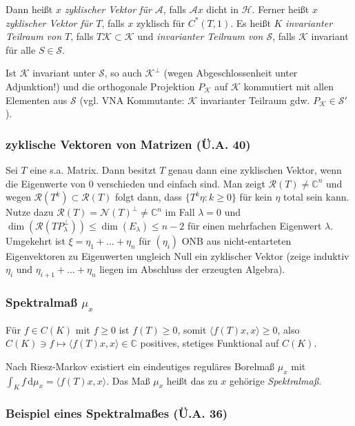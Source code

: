 \documentclass[11pt,a4paper]{scrartcl}
\newcommand{\C}{\mathbb{C}} %
\newcommand{\Hc}{\mathcal{H}}
\newcommand{\Sc}{\mathcal{S}}
\newcommand{\Kc}{\mathcal{K}}
\newcommand{\A}{\mathcal{A}}
\newcommand{\Nc}{\mathcal{N}}
\newcommand{\Rc}{\mathcal{R}}
\theoremstyle{plain}
\theoremstyle{definition}
\theoremstyle{remark}
\begin{document}
Dann heißt $x$ \emph{zyklischer Vektor für $\A$}, falls $\A x$ dicht in $\Hc$. Ferner heißt $x$ \emph{zyklischer Vektor für $T$}, falls $x$ zyklisch für $C^*(T,1)$. Es heißt $K$ \emph{invarianter Teilraum von $T$}, falls $T\Kc \subset \Kc$ und \emph{invarianter Teilraum von $\Sc$}, falls $\Kc$ invariant für alle $S\in \Sc$. 

Ist $\Kc$ invariant unter $\Sc$, so auch $\Kc^\bot$ (wegen Abgeschlossenheit unter Adjunktion!) und die orthogonale Projektion $P_\Kc$ auf $\Kc$ kommutiert mit allen Elementen aus $\Sc$ (vgl. VNA Kommutante: $\Kc$ invarianter Teilraum gdw. $P_\Kc\in \Sc'$).

\subsubsection{zyklische Vektoren von Matrizen (Ü.A. 40)}

Sei $T$ eine s.a. Matrix. Dann besitzt $T$ genau dann eine zyklischen Vektor, wenn die Eigenwerte von $0$ verschieden und einfach sind. Man zeigt $\Rc(T)\neq \C^n$ und wegen $\Rc(T^k) \subset \Rc(T)$ folgt dann, dass $\{T^k\eta: k\geq 0\}$ für kein $\eta$ total sein kann. Nutze dazu $\Rc(T)=\Nc(T)^\bot\neq \C^n$ im Fall $\lambda = 0$ und $\dim(\Rc(TP_\lambda^\bot))\leq \dim(E_\lambda) \leq n-2$ für einen mehrfachen Eigenwert $\lambda$. Umgekehrt ist $\xi=\eta_1+\dots+\eta_n$ für $(\eta_i)$ ONB aus nicht-entarteten Eigenvektoren zu Eigenwerten ungleich Null ein zyklischer Vektor (zeige induktiv $\eta_i$ und $\eta_{i+1}+\dots+\eta_n$ liegen im Abschluss der erzeugten Algebra).

\subsubsection{Spektralmaß $\mu_x$}

Für $f\in C(K)$ mit $f \geq 0$ ist $f(T) \geq 0$, somit $\langle f(T)x, x \rangle \geq 0$, also $C(K)\ni f \mapsto \langle f(T)x,x \rangle \in \C$ positives, stetiges Funktional auf $C(K)$.

Nach Riesz-Markov existiert ein eindeutiges reguläres Borelmaß $\mu_x$ mit $\int_K f \,\mathrm{d}\mu_x = \langle f(T)x, x \rangle$. Das Maß $\mu_x$ heißt das zu $x$ gehörige \emph{Spektralmaß}.


\subsubsection{Beispiel eines Spektralmaßes (Ü.A. 36)}
\end{document}
